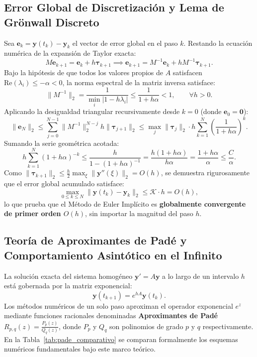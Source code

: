 \documentclass[11pt,a4paper]{article}
\begin{document}
\subsection{Error Global de Discretización y Lema de Grönwall Discreto}
Sea $\mathbf{e}_k = \mathbf{y}(t_k) - \mathbf{y}_k$ el vector de error global en el paso $k$. Restando la ecuación numérica de la expansión de Taylor exacta:
\begin{equation}
    M \mathbf{e}_{k+1} = \mathbf{e}_k + h \boldsymbol{\tau}_{k+1} \implies \mathbf{e}_{k+1} = M^{-1} \mathbf{e}_k + h M^{-1} \boldsymbol{\tau}_{k+1}.
\end{equation}
Bajo la hipótesis de que todos los valores propios de $A$ satisfacen $\text{Re}(\lambda_i) \le -\alpha < 0$, la norma espectral de la matriz inversa satisface:
\begin{equation}
    \|M^{-1}\|_2 = \frac{1}{\min_i |1 - h\lambda_i|} \le \frac{1}{1 + h\alpha} < 1, \qquad \forall h > 0.
\end{equation}
Aplicando la desigualdad triangular recursivamente desde $k = 0$ (donde $\mathbf{e}_0 = \mathbf{0}$):
\begin{equation}
    \|\mathbf{e}_N\|_2 \le \sum_{j=0}^{N-1} \|M^{-1}\|_2^{N-j} h \|\boldsymbol{\tau}_{j+1}\|_2 \le \max_j \|\boldsymbol{\tau}_j\|_2 \cdot h \sum_{k=1}^N \left(\frac{1}{1+h\alpha}\right)^k.
\end{equation}
Sumando la serie geométrica acotada:
\begin{equation}
    h \sum_{k=1}^N (1 + h\alpha)^{-k} \le \frac{h}{1 - (1+h\alpha)^{-1}} = \frac{h (1+h\alpha)}{h\alpha} = \frac{1 + h\alpha}{\alpha} \le \frac{C}{\alpha}.
\end{equation}
Como $\|\boldsymbol{\tau}_{k+1}\|_2 \le \frac{h}{2} \max_{\xi} \|\mathbf{y}''(\xi)\|_2 = O(h)$, se demuestra rigurosamente que el error global acumulado satisface:
\begin{equation}
    \max_{0 \le k \le N} \|\mathbf{y}(t_k) - \mathbf{y}_k\|_2 \le \mathcal{K} \cdot h = O(h),
\end{equation}
lo que prueba que el Método de Euler Implícito es \textbf{globalmente convergente de primer orden $O(h)$}, sin importar la magnitud del paso $h$.

\subsection{Teoría de Aproximantes de Padé y Comportamiento Asintótico en el Infinito}
La solución exacta del sistema homogéneo $\mathbf{y}' = A\mathbf{y}$ a lo largo de un intervalo $h$ está gobernada por la matriz exponencial:
\begin{equation}
    \mathbf{y}(t_{k+1}) = e^{hA} \mathbf{y}(t_k).
\end{equation}
Los métodos numéricos de un solo paso aproximan el operador exponencial $e^z$ mediante funciones racionales denominadas \textbf{Aproximantes de Padé} $R_{p,q}(z) = \frac{P_p(z)}{Q_q(z)}$, donde $P_p$ y $Q_q$ son polinomios de grado $p$ y $q$ respectivamente. En la Tabla~\ref{tab:pade_comparativo} se comparan formalmente los esquemas numéricos fundamentales bajo este marco teórico.
\end{document}
